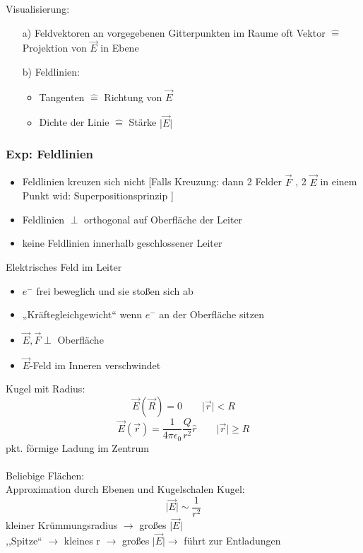 \documentclass[titlepage,12pt,a4paper,ngerman]{report}
\begin{document}
Visualisierung:
\begin{itemize}
\item[a)] Feldvektoren an vorgegebenen Gitterpunkten im Raume oft Vektor $\widehat{=}$ Projektion von $\vec{E}$ in Ebene
\item[b)] Feldlinien: 
\begin{itemize}
\item Tangenten $\widehat{=}$ Richtung von $\vec{E}$
\item Dichte der Linie $\widehat{=}$ Stärke $\vert \vec{E} \vert$
\end{itemize}
\end{itemize}

\subsubsection*{Exp: Feldlinien} %
\begin{itemize}
\item Feldlinien kreuzen sich nicht [Falls Kreuzung: dann 2 Felder $\vec{F}$ , 2 $\vec{E}$ in einem Punkt wid: Superpositionsprinzip ]
\item Feldlinien $\perp$ orthogonal auf Oberfläche der Leiter
\item keine Feldlinien innerhalb geschlossener Leiter
\end{itemize}
Elektrisches Feld im Leiter
\begin{itemize}
\item $e^-$ frei beweglich und sie stoßen sich ab
\item „Kräftegleichgewicht“ wenn $e^-$ an der Oberfläche sitzen
\item $\vec{E}, \vec{F} \perp$ Oberfläche
\item $\vec{E}$-Feld im Inneren verschwindet
\end{itemize}
Kugel mit Radius: $$ \vec{E}(\vec{R}) = 0 \qquad \vert \vec{r} \vert < R$$
$$ \vec{E}(\vec{r}) = \frac{1}{4 \pi\epsilon_0} \frac{Q}{r^2} \hat{r} \qquad \vert \vec{r} \vert \ge R$$
pkt. förmige Ladung im Zentrum\\\\
Beliebige Flächen:\\
Approximation durch Ebenen und Kugelschalen
Kugel:
$$ \vert \vec{E} \vert \sim \frac{1}{r^2} $$
kleiner Krümmungsradius $\rightarrow$ großes $ \vert \vec{E} \vert $\\
,,Spitze`` $\rightarrow$ kleines r $\rightarrow$ großes $\vert \vec{E} \vert \rightarrow$ führt zur Entladungen\\\\
\end{document}
